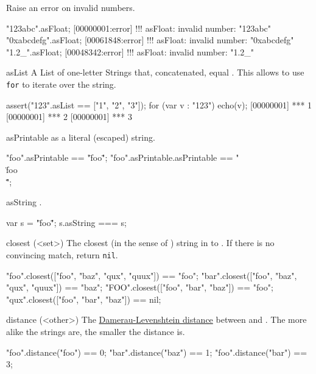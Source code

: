 \begin{urbiscriptapi}
  Raise an error on invalid numbers.

\begin{urbiscript}
"123abc".asFloat;
[00000001:error] !!! asFloat: invalid number: "123abc"
"0xabcdefg".asFloat;
[00061848:error] !!! asFloat: invalid number: "0xabcdefg"
"1.2_".asFloat;
[00048342:error] !!! asFloat: invalid number: "1.2_"
\end{urbiscript}


\item[asList]%
  A List of one-letter Strings that, concatenated, equal \this.  This allows
  to use \lstinline|for| to iterate over the string.
\begin{urbiscript}
assert("123".asList == ["1", "2", "3"]);
for (var v : "123")
  echo(v);
[00000001] *** 1
[00000001] *** 2
[00000001] *** 3
\end{urbiscript}


\item[asPrintable]
  \this as a literal (escaped) string.
\begin{urbiassert}
"foo".asPrintable == "\"foo\"";
"foo".asPrintable.asPrintable == "\"\\\"foo\\\"\"";
\end{urbiassert}


\item[asString]
  \this.
\begin{urbiassert}
var s = "\"foo\"";
s.asString === s;
\end{urbiassert}


\item[closest](<set>)%
  The closest (in the sense of ) string in  to
  \this.  If there is no convincing match, return \lstinline|nil|.
\begin{urbiassert}
"foo".closest(["foo", "baz", "qux", "quux"]) == "foo";
"bar".closest(["foo", "baz", "qux", "quux"]) == "baz";
"FOO".closest(["foo", "bar", "baz"])         == "foo";
"qux".closest(["foo", "bar", "baz"])         == nil;
\end{urbiassert}


\item[distance](<other>)%
  The \href{http://en.wikipedia.org/wiki/Damerau-Levenshtein_distance}
  {Damerau-Levenshtein distance} between \this and .  The more
  alike the strings are, the smaller the distance is.
\begin{urbiassert}
"foo".distance("foo") == 0;
"bar".distance("baz") == 1;
"foo".distance("bar") == 3;


\end{urbiassert}
\end{urbiscriptapi}
